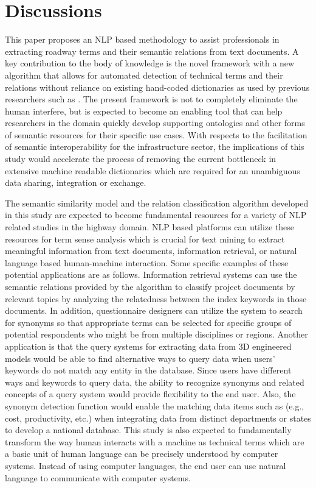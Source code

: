 \documentclass[Journal, BackFigs,NoLists, DoubleSpace]{ascelike}%
\begin{document}
%
\section{Discussions} \label{sec:dis}
This paper proposes an NLP based methodology to assist professionals in extracting roadway terms and their semantic relations from text documents. A key contribution to the body of knowledge is the novel framework with a new algorithm that allows for automated detection of technical terms and their relations without reliance on existing hand-coded dictionaries as used by previous researchers such as . The present framework is not to completely eliminate the human interfere, but is expected to become an enabling tool that can help researchers in the domain quickly develop supporting ontologies and other forms of semantic resources for their specific use cases. With respects to the facilitation of semantic interoperability for the infrastructure sector, the implications of this study would accelerate the process of removing the current bottleneck in extensive machine readable dictionaries which are required for an unambiguous data sharing, integration or exchange. 
\par
The semantic similarity model and the relation classification algorithm developed in this study are expected to become fundamental resources for a variety of NLP related studies in the highway domain. NLP based platforms can utilize these resources for term sense analysis which is crucial for text mining to extract meaningful information from text documents, information retrieval, or natural language based human-machine interaction. Some specific examples of these potential applications are as follows. Information retrieval systems can use the semantic relations provided by the algorithm to classify project documents by relevant topics by analyzing the relatedness between the index keywords in those documents. In addition, questionnaire designers can utilize the system to search for synonyms so that appropriate terms can be selected for specific groups of potential respondents who might be from multiple disciplines or regions. Another application is that the query systems for extracting data from 3D engineered models would be able to find alternative ways to query data when users' keywords do not match any entity in the database. Since users have different ways and keywords to query data, the ability to recognize synonyms and related concepts of a query system would provide flexibility to the end user. Also, the synonym detection function would enable the matching data items such as (e.g., cost, productivity, etc.) when integrating data from distinct departments or states to develop a national database. This study is also expected to fundamentally transform the way human interacts with a machine as technical terms which are a basic unit of human language can be precisely understood by computer systems. Instead of using computer languages, the end user can use natural language to communicate with computer systems.
\end{document}
